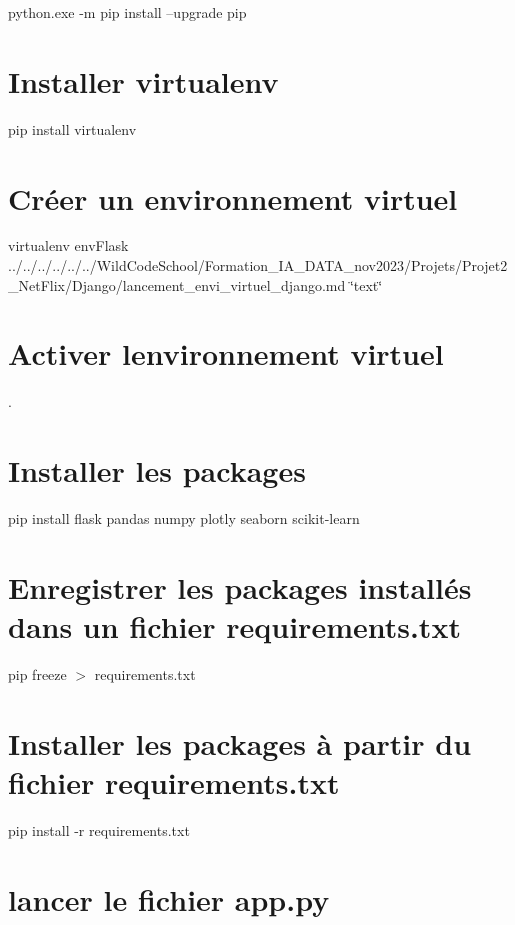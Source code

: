 python.\+exe -\/m pip install --upgrade pip

\section*{Installer virtualenv}

pip install virtualenv

\section*{Créer un environnement virtuel}

virtualenv env\+Flask ../../../../../../\+Wild\+Code\+School/\+Formation\+\_\+\+I\+A\+\_\+\+D\+A\+T\+A\+\_\+nov2023/\+Projets/\+Projet2\+\_\+\+Net\+Flix/\+Django/lancement\+\_\+envi\+\_\+virtuel\+\_\+django.md \char`\"{}text\char`\"{} \section*{Activer l\textquotesingle{}environnement virtuel}

.

\section*{Installer les packages}

pip install flask pandas numpy plotly seaborn scikit-\/learn

\section*{Enregistrer les packages installés dans un fichier requirements.\+txt}

pip freeze $>$ requirements.\+txt

\section*{Installer les packages à partir du fichier requirements.\+txt}

pip install -\/r requirements.\+txt

\section*{lancer le fichier app.\+py}

